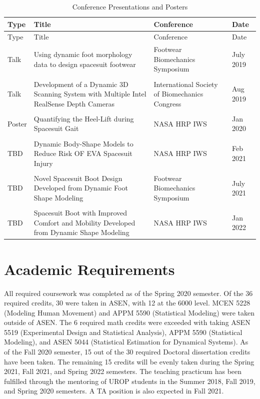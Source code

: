 \documentclass[defaultstyle,11pt]{comps}
\begin{document}
\hypertarget{tbl:conf}{}
\begin{longtable}[]{@{}
  >{\raggedright\arraybackslash}p{}
  >{\raggedright\arraybackslash}p{}
  >{\raggedright\arraybackslash}p{}
  >{\raggedright\arraybackslash}p{}@{}}
\caption{\label{tbl:conf}Conference Presentations and Posters}\tabularnewline
\toprule
Type & Title & Conference & Date \\
\midrule
\endfirsthead
\toprule
Type & Title & Conference & Date \\
\midrule
\endhead
Talk & Using dynamic foot morphology data to design spacesuit footwear & Footwear Biomechanics Symposium & July 2019 \\
& & & \\
Talk & Development of a Dynamic 3D Scanning System with Multiple Intel RealSense Depth Cameras & International Society of Biomechanics Congress & Aug 2019 \\
& & & \\
Poster & Quantifying the Heel-Lift during Spacesuit Gait & NASA HRP IWS & Jan 2020 \\
& & & \\
TBD & Dynamic Body-Shape Models to Reduce Risk OF EVA Spacesuit Injury & NASA HRP IWS & Feb 2021 \\
& & & \\
TBD & Novel Spacesuit Boot Design Developed from Dynamic Foot Shape Modeling & Footwear Biomechanics Symposium & July 2021 \\
& & & \\
TBD & Spacesuit Boot with Improved Comfort and Mobility Developed from Dynamic Shape Modeling & NASA HRP IWS & Jan 2022 \\
\bottomrule
\end{longtable}

\hypertarget{academic-requirements}{%
\section{Academic Requirements}\label{academic-requirements}}

All required coursework was completed as of the Spring 2020 semester. Of the 36 required credits, 30 were taken in ASEN, with 12 at the 6000 level. MCEN 5228 (Modeling Human Movement) and APPM 5590 (Statistical Modeling) were taken outside of ASEN. The 6 required math credits were exceeded with taking ASEN 5519 (Experimental Design and Statistical Analysis), APPM 5590 (Statistical Modeling), and ASEN 5044 (Statistical Estimation for Dynamical Systems). As of the Fall 2020 semester, 15 out of the 30 required Doctoral dissertation credits have been taken. The remaining 15 credits will be evenly taken during the Spring 2021, Fall 2021, and Spring 2022 semesters. The teaching practicum has been fulfilled through the mentoring of UROP students in the Summer 2018, Fall 2019, and Spring 2020 semesters. A TA position is also expected in Fall 2021.
\end{document}
